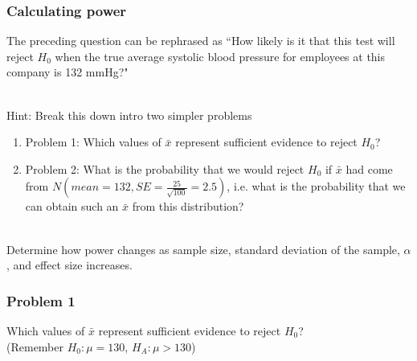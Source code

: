 
\begin{frame}
\frametitle{Calculating power}

The preceding question can be rephrased as ``How likely is it that this test will reject $H_0$ when the true average systolic blood pressure for employees at this company is 132 mmHg?"

~\\
\pause
Hint: Break this down intro two simpler problems
\pause
\begin{enumerate}
\item Problem 1: Which values of $\bar{x}$ represent sufficient evidence to reject $H_0$?
\pause
\item Problem 2: What is the probability that we would reject $H_0$ if $\bar{x}$ had come from $N\left(mean = 132, SE = \frac{25}{\sqrt{100}} = 2.5\right)$, i.e. what is the probability that we can obtain such an $\bar{x}$ from this distribution?
\end{enumerate}
\vspace{-2mm}
~\\
\pause
Determine how power changes as sample size, standard deviation of the sample, $\alpha$, and effect size increases.


\end{frame}



\begin{frame}
\frametitle{Problem 1}

Which values of $\bar{x}$ represent sufficient evidence to reject $H_0$? \\
(Remember $H_0: \mu = 130$, $H_A: \mu > 130$)

\end{frame}

